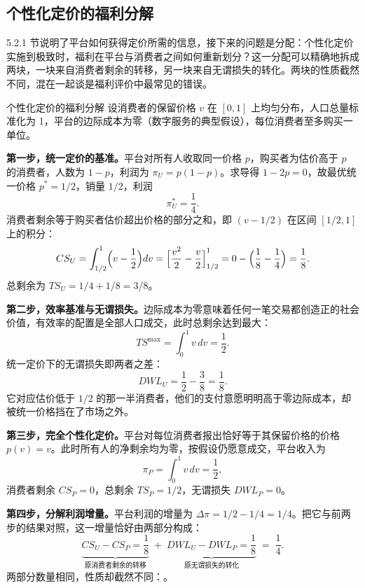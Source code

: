 \subsection{个性化定价的福利分解}

5.2.1 节说明了平台如何获得定价所需的信息，接下来的问题是分配：个性化定价实施到极致时，福利在平台与消费者之间如何重新划分？这一分配可以精确地拆成两块，一块来自消费者剩余的转移，另一块来自无谓损失的转化。两块的性质截然不同，混在一起谈是福利评价中最常见的错误。

\begin{derivation}{个性化定价的福利分解}{}
设消费者的保留价格 $v$ 在 $[0,1]$ 上均匀分布，人口总量标准化为 1，平台的边际成本为零（数字服务的典型假设），每位消费者至多购买一单位。

\textbf{第一步，统一定价的基准。}平台对所有人收取同一价格 $p$，购买者为估价高于 $p$ 的消费者，人数为 $1-p$，利润为 $\pi_U = p(1-p)$。求导得 $1-2p=0$，故最优统一价格 $p^* = 1/2$，销量 $1/2$，利润
\[
\pi_U^* = \frac{1}{4}.
\]
消费者剩余等于购买者估价超出价格的部分之和，即 $(v-1/2)$ 在区间 $[1/2,1]$ 上的积分：
\[
CS_U = \int_{1/2}^{1}\Bigl(v - \frac{1}{2}\Bigr)dv = \Bigl[\frac{v^2}{2} - \frac{v}{2}\Bigr]_{1/2}^{1} = 0 - \Bigl(\frac{1}{8}-\frac{1}{4}\Bigr) = \frac{1}{8}.
\]
总剩余为 $TS_U = 1/4 + 1/8 = 3/8$。

\textbf{第二步，效率基准与无谓损失。}边际成本为零意味着任何一笔交易都创造正的社会价值，有效率的配置是全部人口成交，此时总剩余达到最大：
\[
TS^{\max} = \int_0^1 v\, dv = \frac{1}{2}.
\]
统一定价下的无谓损失即两者之差：
\[
DWL_U = \frac{1}{2} - \frac{3}{8} = \frac{1}{8}.
\]
它对应估价低于 $1/2$ 的那一半消费者，他们的支付意愿明明高于零边际成本，却被统一价格挡在了市场之外。

\textbf{第三步，完全个性化定价。}平台对每位消费者报出恰好等于其保留价格的价格 $p(v) = v$。此时所有人的净剩余均为零，按假设仍愿意成交，平台收入为
\[
\pi_P = \int_0^1 v\, dv = \frac{1}{2},
\]
消费者剩余 $CS_P = 0$，总剩余 $TS_P = 1/2$，无谓损失 $DWL_P = 0$。

\textbf{第四步，分解利润增量。}平台利润的增量为 $\Delta\pi = 1/2 - 1/4 = 1/4$。把它与前两步的结果对照，这一增量恰好由两部分构成：
\[
\underbrace{CS_U - CS_P = \frac{1}{8}}_{\text{原消费者剩余的转移}} \;+\; \underbrace{DWL_U - DWL_P = \frac{1}{8}}_{\text{原无谓损失的转化}} \;=\; \frac{1}{4}.
\]
两部分数量相同，性质却截然不同：。
\end{derivation}

